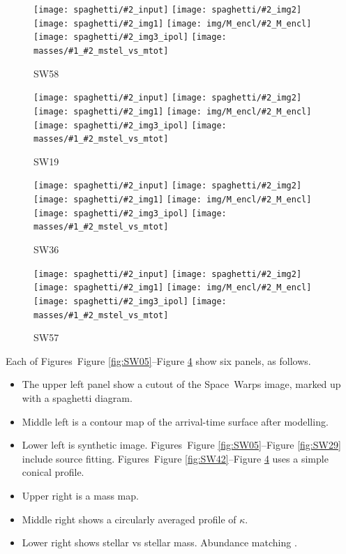 \documentclass[fleqn,usenatbib]{mnras}
\newcommand{\inclfig}[2]{
  \centering
	\texttt{[image: spaghetti/\#2\_input]}%
	\texttt{[image: spaghetti/\#2\_img2]}
	\texttt{[image: spaghetti/\#2\_img1]}%
	\texttt{[image: img/M\_encl/\#2\_M\_encl]}
	\texttt{[image: spaghetti/\#2\_img3\_ipol]}%
	\texttt{[image: masses/\#1\_\#2\_mstel\_vs\_mtot]}
}
\newcommand{\figref}[1]{Figure \ref{fig:#1}}
\begin{document}
\begin{figure}
  \inclfig{SW58}{ASW0007iwp_4XBJWT3COV}
  \caption{SW58}
  \label{fig:SW58}
\end{figure}

\begin{figure}
  \inclfig{SW19}{ASW0001ld7_OS3CYAKLRT}
  \caption{SW19}
  \label{fig:SW19}
\end{figure}


\begin{figure}
  \inclfig{SW36}{ASW000096t_7IPP7LWVOF}
  \caption{SW36}
  \label{fig:SW36}
\end{figure}

\begin{figure}
  \inclfig{SW57}{ASW0008pag_5SXGXQYY6V}
  \caption{SW57}
  \label{fig:SW57}
\end{figure}

Each of Figures~\figref{SW05}--\figref{SW57} show six panels, as
follows.

\begin{itemize}

\item The upper left panel show a cutout of the Space~Warps image,
  marked up with a spaghetti diagram.

\item Middle left is a contour map of the arrival-time surface after
  modelling.

\item Lower left is synthetic image.
  Figures~\figref{SW05}--\figref{SW29} include source fitting.
  Figures~\figref{SW42}--\figref{SW57} uses a simple conical
  profile.

\item Upper right is a mass map.

\item Middle right shows a circularly averaged profile of
  $\kappa$.

\item Lower right shows stellar vs stellar mass.  Abundance matching \citep{2010ApJ...710..903M}.

\end{itemize}
\end{document}
